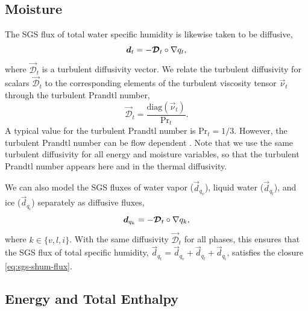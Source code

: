\documentclass{report}
\begin{document}
\subsection{Moisture}

The SGS flux of total water specific humidity is likewise taken to be diffusive,
\begin{equation}\label{eq:sgs-shum-flux}
\boldsymbol{{d}}_{t} = - \boldsymbol{{\mathcal{D}}}_t \circ \nabla q_t,
\end{equation}
where $\vec{\mathcal{D}}_t$ is a turbulent diffusivity vector. We relate the turbulent diffusivity for scalars $\vec{\mathcal{D}}_t$ to the corresponding elements of the turbulent viscosity tensor $\vec{\nu}_t$ through the turbulent Prandtl number, 
\begin{equation}
\vec{\mathcal{D}}_t = \frac{\mathrm{diag}(\vec{\nu}_t)}{\mathrm{Pr}_{t}}.
\end{equation} 
A typical value for the turbulent Prandtl number is $\mathrm{Pr}_{t} = 1/3$. However, the turbulent Prandtl number can be flow dependent \citep[e.g.,][]{Deardorff80a}. Note that we use the same turbulent diffusivity for all energy and moisture variables, so that the turbulent Prandtl number appears here and in the thermal diffusivity.

We can also model the SGS fluxes of water vapor ($\vec{d}_{q_v}$), liquid water ($\vec{d}_{q_l}$), and ice ($\vec{d}_{q_i}$) separately as diffusive fluxes, 
\begin{equation}\label{e:water_diffusion}
    \boldsymbol{{d}}_{q_k} = - \boldsymbol{{\mathcal{D}}}_t \circ \nabla q_k,
\end{equation}
where $k \in \{v, l, i\}$. With the same diffusivity $\vec{\mathcal{D}}_t$ for all phases, this ensures that the SGS flux of total specific humidity, $\vec{d}_{q_t} = \vec{d}_{q_v} + \vec{d}_{q_l} + \vec{d}_{q_i}$, satisfies the closure \eqref{eq:sgs-shum-flux}.

\subsection{Energy and Total Enthalpy}\label{s:energy_total_enthalpy}
\end{document}
